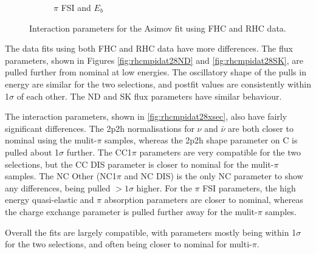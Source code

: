\begin{figure}[t]
\begin{subfigure}{0.49\textwidth}
  \caption{$\pi$ FSI and $E_b$}
\end{subfigure}
\caption{Interaction parameters for the Asimov fit using FHC and RHC data.}
\label{fig:rhcmpiasmvxsec}
\end{figure}

The data fits using both FHC and RHC data have more differences. The flux parameters, shown in Figures \ref{fig:rhcmpidat28ND} and \ref{fig:rhcmpidat28SK}, are pulled further from nominal at low energies. The oscillatory shape of the pulls in energy are similar for the two selections, and postfit values are consistently within 1$\sigma$ of each other. The ND and SK flux parameters have similar behaviour.
 
The interaction parameters, shown in \ref{fig:rhcmpidat28xsec}, also have fairly significant differences. The 2p2h normalisations for $\nu$ and $\bar{\nu}$ are both closer to nominal using the mulit-$\pi$ samples, whereas the 2p2h shape parameter on C is pulled about 1$\sigma$ further. The CC1$\pi$ parameters are very compatible for the two selections, but the CC DIS parameter is closer to nominal for the mulit-$\pi$ samples. The NC Other (NC1$\pi$ and NC DIS) is the only NC parameter to show any differences, being pulled $>1\sigma$ higher. For the $\pi$ FSI parameters, the high energy quasi-elastic and $\pi$ absorption parameters are closer to nominal, whereas the charge exchange parameter is pulled further away for the mulit-$\pi$ samples.

Overall the fits are largely compatible, with parameters mostly being within 1$\sigma$ for the two selections, and often being closer to nominal for multi-$\pi$.

